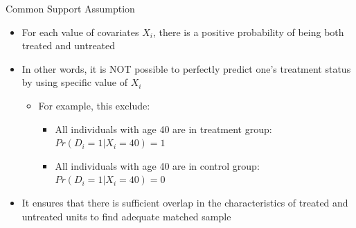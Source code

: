 \documentclass[hyperref={pdfpagelabels=false}]{beamer}
\begin{document}
\begin{frame}{Common Support Assumption}
	\begin{itemize}
		\begin{block}{Common Support Assumption}	
			\begin{equation*}
			0<\Pr(D_{i}=1|X_{i})<1  	
			\end{equation*}
		\end{block}
		\item For each value of covariates $X_{i}$, there is a positive probability of being both treated and untreated 
		\vspace{0.2cm}
		\item In other words, it is NOT possible to perfectly predict one's treatment status by using specific value of $X_{i}$
		\vspace{0.2cm}
		\begin{itemize}	
			\item For example, this exclude:
			\vspace{0.2cm}
					\begin{itemize}	
			\item All individuals with age 40 are in treatment group: $Pr(D_{i}=1|X_{i}=40)=1$
				\vspace{0.2cm}
			\item All individuals with age 40 are in control group: $Pr(D_{i}=1|X_{i}=40)=0$
				\end{itemize}
		\end{itemize}
				\vspace{0.2cm}
		\item It ensures that there is sufficient overlap in the characteristics of treated and untreated units to find adequate matched sample	
		
	\end{itemize}
\end{frame}
\end{document}

